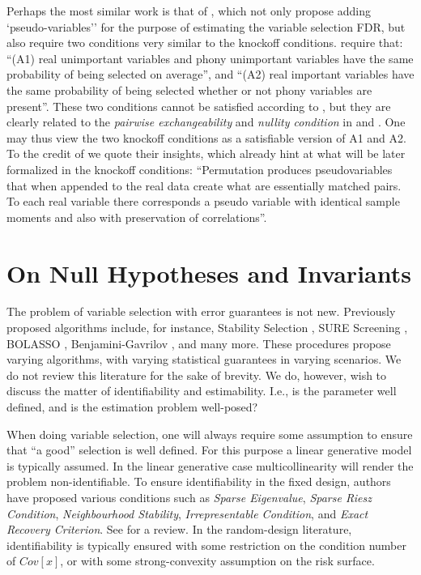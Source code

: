 \documentclass[article,lineno]{biometrika}
\begin{document}
Perhaps the most similar work is that of \cite{WuControllingVariableSelection2007}, which not only propose adding `pseudo-variables'' for the purpose of estimating the variable selection FDR, but also require two conditions very similar to the knockoff conditions.
\cite{WuControllingVariableSelection2007} require that:
``(A1) real unimportant variables and phony unimportant variables have the same probability of being selected on average'', and
``(A2) real important variables have the same probability of being selected whether or not phony variables are present''.
These two conditions cannot be satisfied according to \cite{WuControllingVariableSelection2007}, but they are clearly related to the \emph{pairwise exchangeability} and \emph{nullity condition} in \cite{SesiaGenehuntinghidden} and \cite{CandesPanninggoldmodelX2018}.
One may thus view the two knockoff conditions as a satisfiable version of A1 and A2.
To the credit of \cite{WuControllingVariableSelection2007} we quote their insights, which already hint at what will be later formalized in the knockoff conditions:
``Permutation produces pseudovariables that when appended to the real data create what
are essentially matched pairs. To each real variable there corresponds a pseudo variable with identical sample moments and also with preservation of correlations''.



\section{On Null Hypotheses and Invariants}
The problem of variable selection with error guarantees is not new.
Previously proposed algorithms include, for instance, Stability Selection \citep{MeinshausenStabilityselection2010}, SURE Screening \citep{fan2008sure}, BOLASSO \citep{bach2008bolasso}, Benjamini-Gavrilov \citep{Benjaminisimpleforwardselection2009}, and many more.
These procedures propose varying algorithms, with varying statistical guarantees in varying scenarios.
We do not review this literature for the sake of brevity.
We do, however, wish to discuss the matter of identifiability and estimability.
I.e., is the parameter well defined, and is the estimation problem well-posed?

When doing variable selection, one will always require some assumption to ensure that ``a good'' selection is well defined.
For this purpose a linear generative model is typically assumed.
In the linear generative case multicollinearity will render the problem non-identifiable.
To ensure identifiability in the fixed design, authors have proposed various conditions such as \emph{Sparse Eigenvalue}, \emph{Sparse Riesz Condition}, \emph{Neighbourhood Stability}, \emph{Irrepresentable Condition}, and \emph{Exact Recovery Criterion}.
See \citet[Sec 3.1.1]{MeinshausenStabilityselection2010} for a review.
In the random-design literature, identifiability is typically ensured with some restriction on the condition number of $Cov[x]$, or with some strong-convexity assumption on the risk surface.
\end{document}
